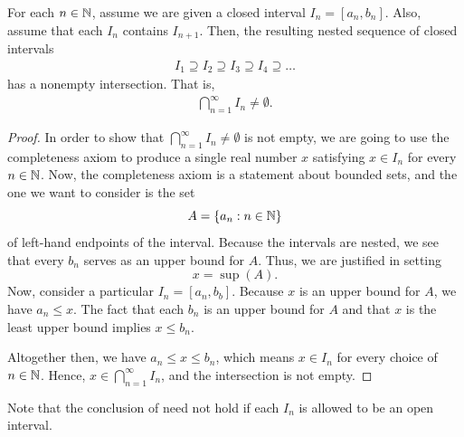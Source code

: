 \begin{theorem}
  For each $n \in \mathbb N$, assume we are given a closed interval $I_n =
  [a_n, b_n]$. Also, assume that each $I_n$ contains $I_{n + 1}$.
  Then, the resulting nested sequence of closed intervals
  \begin{align*}
    I_1 \supseteq I_2 \supseteq I_3 \supseteq I_4 \supseteq \dots
  \end{align*}
  has a nonempty intersection. That is,
  \begin{align*}
    \bigcap_{n = 1}^{\infty} I_n \neq \emptyset.
  \end{align*}
\end{theorem}

\begin{proof}
  In order to show that $\bigcap_{n = 1}^{\infty} I_n \neq \emptyset$
  is not empty, we are going to use the completeness axiom to produce
  a single real number $x$ satisfying $x \in I_n$ for every $n \in
  \mathbb N$. Now, the completeness axiom is a statement about bounded
  sets, and the one we want to consider is the set
  \[ A = \{ a_n : n \in \mathbb N \} \]
  of left-hand endpoints of the interval. Because the intervals are
  nested, we see that every $b_n$ serves as an upper bound for $A$.
  Thus, we are justified in setting
  \[ x = \sup(A). \]
  Now, consider a particular $I_n = [a_n, b_b]$. Because $x$ is an
  upper bound for $A$, we have $a_n \leq x$. The fact that each $b_n$
  is an upper bound for $A$ and that $x$ is the least upper bound
  implies $x \leq b_n$.

  Altogether then, we have $a_n \leq x \leq b_n$, which means $x \in
  I_n$ for every choice of $n \in \mathbb N$. Hence, $x \in \bigcap_{n =
  1}^{\infty} I_n$, and the intersection is not empty.
\end{proof}

\begin{remark}
  Note that the conclusion of  need
  not hold if each $I_n$ is allowed to be an open interval.
\end{remark}
